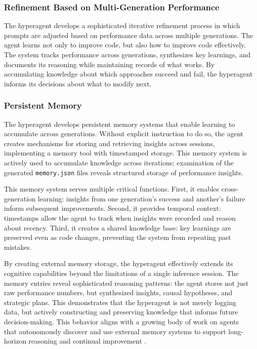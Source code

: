 \subsubsection{Refinement Based on Multi-Generation Performance}

The hyperagent develops a sophisticated iterative refinement process in which prompts are adjusted based on performance data across multiple generations. The agent learns not only to improve code, but also how to improve code effectively. The system tracks performance across generations, synthesizes key learnings, and documents its reasoning while maintaining records of what works. By accumulating knowledge about which approaches succeed and fail, the hyperagent informs its decisions about what to modify next.

\subsubsection{Persistent Memory}

The hyperagent develops persistent memory systems that enable learning to accumulate across generations. Without explicit instruction to do so, the agent creates mechanisms for storing and retrieving insights across sessions, implementing a memory tool with timestamped storage. This memory system is actively used to accumulate knowledge across iterations; examination of the generated \texttt{memory.json} files reveals structured storage of performance insights.

This memory system serves multiple critical functions. First, it enables cross-generation learning: insights from one generation's success and another's failure inform subsequent improvements. Second, it provides temporal context: timestamps allow the agent to track when insights were recorded and reason about recency. Third, it creates a shared knowledge base: key learnings are preserved even as code changes, preventing the system from repeating past mistakes.

By creating external memory storage, the hyperagent effectively extends its cognitive capabilities beyond the limitations of a single inference session. The memory entries reveal sophisticated reasoning patterns: the agent stores not just raw performance numbers, but synthesized insights, causal hypotheses, and strategic plans. This demonstrates that the hyperagent is not merely logging data, but actively constructing and preserving knowledge that informs future decision-making.
This behavior aligns with a growing body of work on agents that autonomously discover and use external memory systems to support long-horizon reasoning and continual improvement \citep{wei2025evo, weng2026group, zhang2026memskill, xiong2026mem}.

